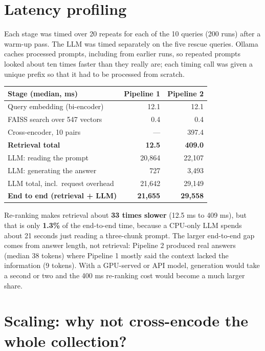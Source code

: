 \documentclass[10pt,a4paper]{article}
\begin{document}
\section{Latency profiling}

Each stage was timed over 20 repeats for each of the 10 queries (200 runs) after a warm-up
pass. The LLM was timed separately on the five rescue queries. Ollama caches processed
prompts, including from earlier runs, so repeated prompts looked about ten times faster than
they really are; each timing call was given a unique prefix so that it had to be processed
from scratch.

\begin{center}\small
\begin{tabular}{lrr}
\toprule
Stage (median, ms) & Pipeline 1 & Pipeline 2 \\
\midrule
Query embedding (bi-encoder) & 12.1 & 12.1 \\
FAISS search over 547 vectors & 0.4 & 0.4 \\
Cross-encoder, 10 pairs & --- & 397.4 \\
\midrule
\textbf{Retrieval total} & \textbf{12.5} & \textbf{409.0} \\
\midrule
LLM: reading the prompt & 20,864 & 22,107 \\
LLM: generating the answer & 727 & 3,493 \\
LLM total, incl.\ request overhead & 21,642 & 29,149 \\
\midrule
\textbf{End to end (retrieval + LLM)} & \textbf{21,655} & \textbf{29,558} \\
\bottomrule
\end{tabular}
\end{center}

Re-ranking makes retrieval about \textbf{33 times slower} (12.5 ms to 409 ms), but that is
only \textbf{1.3\%} of the end-to-end time, because a CPU-only LLM spends about 21 seconds
just reading a three-chunk prompt. The larger end-to-end gap comes from answer length, not
retrieval: Pipeline 2 produced real answers (median 38 tokens) where Pipeline 1 mostly said
the context lacked the information (9 tokens). With a GPU-served or API model, generation
would take a second or two and the 400 ms re-ranking cost would become a much larger share.

\section{Scaling: why not cross-encode the whole collection?}
\end{document}
